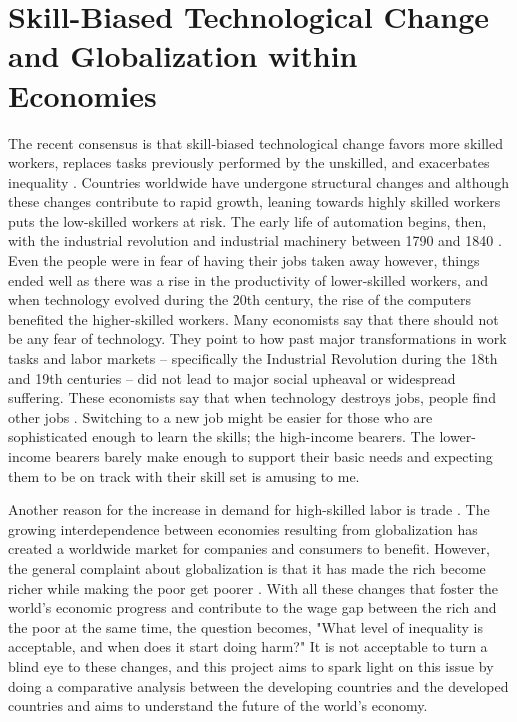 \section{Skill-Biased Technological Change and Globalization within Economies}
The recent consensus is that skill-biased technological change favors more skilled workers, replaces tasks previously performed by the unskilled, and exacerbates inequality \cite{acemoglu2002technical}. Countries worldwide have undergone structural changes and although these changes contribute to rapid growth, leaning towards highly skilled workers puts the low-skilled workers at risk. The early life of automation begins, then, with the industrial revolution and industrial machinery between 1790 and 1840 \cite{thinkautomation_2020}. Even the people were in fear of having their jobs taken away however, things ended well as there was a rise in the productivity of lower-skilled workers, and when technology evolved during the 20th century, the rise of the computers benefited the higher-skilled workers. Many economists say that there should not be any fear of technology. They point to how past major transformations in work tasks and labor markets – specifically the Industrial Revolution during the 18th and 19th centuries – did not lead to major social upheaval or widespread suffering. These economists say that when technology destroys jobs, people find other jobs
\cite{vardi_2019}. Switching to a new job might be easier for those who are sophisticated enough to learn the skills; the high-income bearers. The lower-income bearers barely make enough to support their basic needs and expecting them to be on track with their skill set is amusing to me.

Another reason for the increase in demand for high-skilled labor is trade \cite{kang2002technological}. The growing interdependence between economies resulting from globalization has created a worldwide market for companies and consumers to benefit. However, the general complaint about globalization is that it has made the rich become richer while making the poor get poorer \cite{collins_2015}. With all these changes that foster the world's economic progress and contribute to the wage gap between the rich and the poor at the same time, the question becomes, "What level of inequality is acceptable, and when does it start doing harm?" It is not acceptable to turn a blind eye to these changes, and this project aims to spark light on this issue by doing a comparative analysis between the developing countries and the developed countries and aims to understand the future of the world's economy.  



